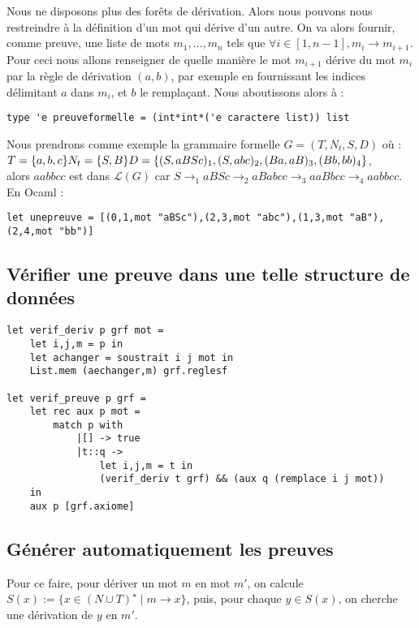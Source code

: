 \documentclass[a4paper,12pt]{article}
\begin{document}
Nous ne disposons plus des forêts de dérivation. Alors nous pouvons nous restreindre à la définition d'un mot qui dérive d'un autre.
On va alors fournir, comme preuve, une liste de mots $m_1, \dots, m_n$ tels que $\forall i\in [1,n-1], m_i \rightarrow m_{i+1}$. 
Pour ceci nous allons renseigner de quelle manière le mot $m_{i+1}$ dérive du mot $m_i$ par la règle de dérivation $(a,b)$, par exemple en fournissant les indices délimitant $a$ dans $m_i$, et $b$ le remplaçant.
Nous aboutissons alors à :
\begin{verbatim}
type 'e preuveformelle = (int*int*('e caractere list)) list
\end{verbatim}

Nous prendrons comme exemple la grammaire formelle $G = (T,N_t,S,D)$ où :\\
$
T = \{a,b,c\}\\
N_t = \{S,B\}\\
D = \{(S,aBSc)_1,(S,abc)_2,(Ba,aB)_3,(Bb,bb)_4\}
$,\\
alors $aabbcc$ est dans $\mathcal{L}(G)$ car $S \rightarrow_1 aBSc \rightarrow_2 aBabcc \rightarrow_3 aaBbcc \rightarrow_4 aabbcc$.\\
En Ocaml :
\begin{verbatim}
let unepreuve = [(0,1,mot "aBSc"),(2,3,mot "abc"),(1,3,mot "aB"),(2,4,mot "bb")]
\end{verbatim}

\subsection{Vérifier une preuve dans une telle structure de données}

\begin{verbatim}
let verif_deriv p grf mot = 
    let i,j,m = p in
    let achanger = soustrait i j mot in
    List.mem (aechanger,m) grf.reglesf

let verif_preuve p grf = 
    let rec aux p mot = 
        match p with
            |[] -> true
            |t::q -> 
                let i,j,m = t in
                (verif_deriv t grf) && (aux q (remplace i j mot))
    in 
    aux p [grf.axiome]

\end{verbatim}

\subsection{Générer automatiquement les preuves}

Pour ce faire, pour dériver un mot $m$ en mot $m'$, on calcule $S(x) := \{x \in (N\cup T)^\star \mid m \rightarrow x\}$,
puis, pour chaque $ y \in S(x)$, on cherche une dérivation de $y$ en $m'$.
\end{document}
